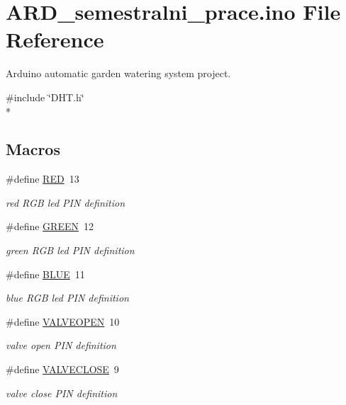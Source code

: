 \hypertarget{ARD__semestralni__prace_8ino}{}\section{A\+R\+D\+\_\+semestralni\+\_\+prace.\+ino File Reference}
\label{ARD__semestralni__prace_8ino}


Arduino automatic garden watering system project.  


{\ttfamily \#include \char`\"{}D\+H\+T.\+h\char`\"{}}\\*
\subsection*{Macros}
\begin{DoxyCompactItemize}
\item 
\#define \hyperlink{group__const_ga8d23feea868a983c8c2b661e1e16972f}{R\+ED}~13
\begin{DoxyCompactList}\small\item\em red R\+GB led P\+IN definition \end{DoxyCompactList}\item 
\#define \hyperlink{group__const_gacfbc006ea433ad708fdee3e82996e721}{G\+R\+E\+EN}~12
\begin{DoxyCompactList}\small\item\em green R\+GB led P\+IN definition \end{DoxyCompactList}\item 
\#define \hyperlink{group__const_ga79d10e672abb49ad63eeaa8aaef57c38}{B\+L\+UE}~11
\begin{DoxyCompactList}\small\item\em blue R\+GB led P\+IN definition \end{DoxyCompactList}\item 
\#define \hyperlink{group__const_ga01d9e55721bcb62fc43ce6590381e7a1}{V\+A\+L\+V\+E\+O\+P\+EN}~10
\begin{DoxyCompactList}\small\item\em valve open P\+IN definition \end{DoxyCompactList}\item 
\#define \hyperlink{group__const_ga62c161c7c128e6b536eb24b11d79ee1a}{V\+A\+L\+V\+E\+C\+L\+O\+SE}~9
\begin{DoxyCompactList}\small\item\em valve close P\+IN definition \end{DoxyCompactList}\item 

\end{DoxyCompactItemize}

